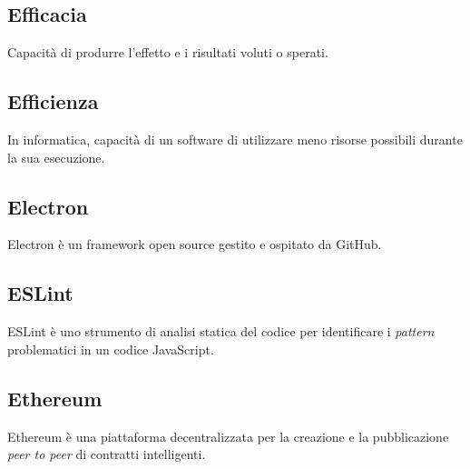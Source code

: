 
\subsection*{Efficacia}
Capacità di produrre l'effetto e i risultati voluti o sperati.

\subsection*{Efficienza}
In informatica, capacità di un software di utilizzare meno risorse possibili durante la sua esecuzione.

\subsection*{Electron}
Electron è un framework open source gestito e ospitato da GitHub.

\subsection*{ESLint}
ESLint è uno strumento di analisi statica del codice per identificare i \textit{pattern} problematici in un codice JavaScript.

\subsection*{Ethereum}
Ethereum è una piattaforma decentralizzata per la creazione e la pubblicazione \textit{peer to peer} di contratti intelligenti.


